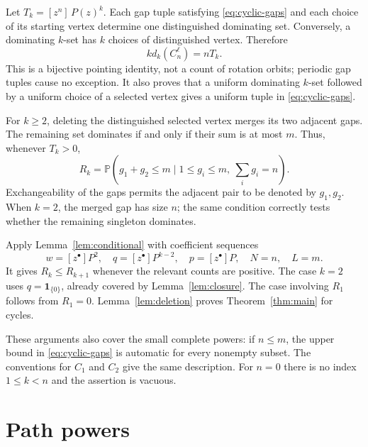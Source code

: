 \documentclass[11pt]{article}
\theoremstyle{definition}
\theoremstyle{remark}
\newcommand{\coef}[2]{[z^{#1}]\,#2}
\newcommand{\Prob}{\mathbb{P}}
\newcommand{\ind}{\mathbf{1}}
\begin{document}
Let $T_k=\coef{n}{P(z)^k}$. Each gap tuple satisfying
\eqref{eq:cyclic-gaps} and each choice of its starting vertex determine
one distinguished dominating set. Conversely, a dominating $k$-set has
$k$ choices of distinguished vertex. Therefore
\begin{equation}\label{eq:cycle-count}
 k d_k(C_n^\ell)=nT_k.
\end{equation}
This is a bijective pointing identity, not a count of rotation orbits;
periodic gap tuples cause no exception. It also proves that a uniform
dominating $k$-set followed by a uniform choice of a selected vertex gives
a uniform tuple in \eqref{eq:cyclic-gaps}.

For $k\geq2$, deleting the distinguished selected vertex merges its two
adjacent gaps. The remaining set dominates if and only if their sum is
at most $m$. Thus, whenever $T_k>0$,
\begin{equation}\label{eq:cycle-R}
 R_k=\Prob(g_1+g_2\leq m\mid 1\leq g_i\leq m,\ \textstyle\sum_i g_i=n).
\end{equation}
Exchangeability of the gaps permits the adjacent pair to be denoted by
$g_1,g_2$. When $k=2$, the merged gap has size $n$; the same condition
correctly tests whether the remaining singleton dominates.

Apply Lemma~\ref{lem:conditional} with coefficient sequences
\[
 w=[z^\bullet]P^2,\quad q=[z^\bullet]P^{k-2},\quad
 p=[z^\bullet]P,\quad N=n,\quad L=m.
\]
It gives $R_k\leq R_{k+1}$ whenever the relevant counts are positive.
The case $k=2$ uses $q=\ind_{\{0\}}$, already covered by
Lemma~\ref{lem:closure}. The case involving $R_1$ follows from $R_1=0$.
Lemma~\ref{lem:deletion} proves Theorem~\ref{thm:main} for cycles.

These arguments also cover the small complete powers: if $n\leq m$, the
upper bound in \eqref{eq:cyclic-gaps} is automatic for every nonempty
subset. The conventions for $C_1$ and $C_2$ give the same description.
For $n=0$ there is no index $1\leq k<n$ and the assertion is vacuous.

\section{Path powers}\label{sec:path}
\end{document}
